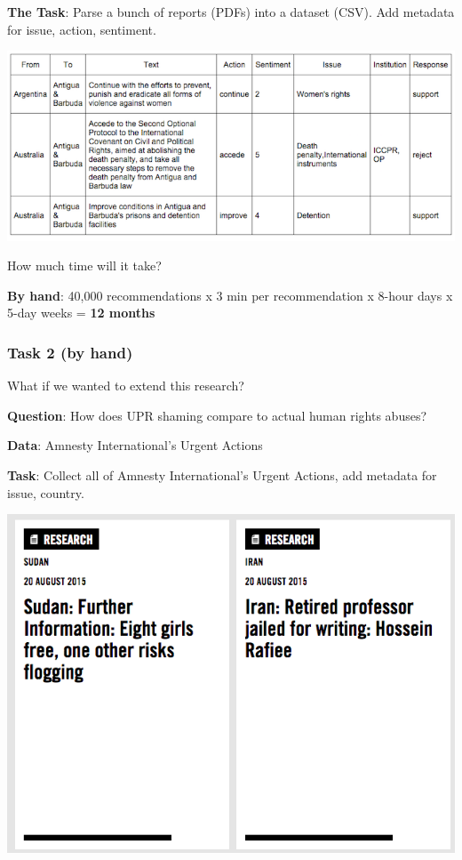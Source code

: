 \documentclass[]{book}
\begin{document}
\textbf{The Task}: Parse a bunch of reports (PDFs) into a dataset (CSV).
Add metadata for issue, action, sentiment.

\begin{center}\includegraphics[width=0.7\linewidth]{img/upr-table} \end{center}

How much time will it take?

\textbf{By hand}: 40,000 recommendations x 3 min per recommendation x
8-hour days x 5-day weeks = \textbf{12 months}

\subsubsection*{Task 2 (by hand)}\label{task-2-by-hand}

What if we wanted to extend this research?

\textbf{Question}: How does UPR shaming compare to actual human rights
abuses?

\textbf{Data}: Amnesty International's Urgent Actions

\textbf{Task}: Collect all of Amnesty International's Urgent Actions,
add metadata for issue, country.

\begin{center}\includegraphics[width=0.7\linewidth]{img/amnesty} \end{center}
\end{document}
